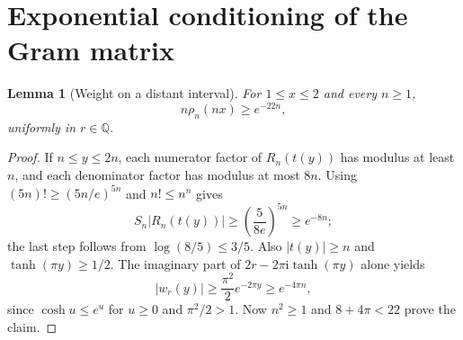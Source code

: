 \documentclass[11pt]{article}
\newtheorem{lemma}[theorem]{Lemma}
\numberwithin{equation}{section}
\newcommand{\Q}{\mathbb Q}
\newcommand{\ii}{\mathrm i}
\begin{document}
\section{Exponential conditioning of the Gram matrix}
\label{sec:conditioning}

\begin{lemma}[Weight on a distant interval]\label{lem:weight}
For $1\leq x\leq2$ and every $n\geq1$,
\[
                             n\rho_n(nx)\geq e^{-22n},
\]
uniformly in $r\in\Q$.
\end{lemma}
\begin{proof}
If $n\leq y\leq2n$, each numerator factor of $R_n(t(y))$ has modulus
at least $n$, and each denominator factor has modulus at most $8n$.
Using $(5n)!\geq(5n/e)^{5n}$ and $n!\leq n^n$ gives
\[
 S_n|R_n(t(y))|\geq\left(\frac5{8e}\right)^{5n}\geq e^{-8n};
\]
the last step follows from $\log(8/5)\leq3/5$.
Also $|t(y)|\geq n$ and $\tanh(\pi y)\geq1/2$.
The imaginary part of $2r-2\pi\ii\tanh(\pi y)$ alone yields
\[
 |w_r(y)|\geq\frac{\pi^2}{2}e^{-2\pi y}\geq e^{-4\pi n},
\]
since $\cosh u\leq e^u$ for $u\geq0$ and $\pi^2/2>1$.
Now $n^2\geq1$ and $8+4\pi<22$ prove the claim.
\end{proof}
\end{document}
